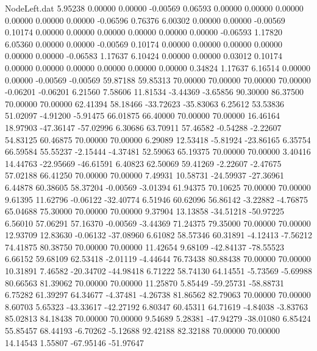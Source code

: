 \begin{filecontents}{NodeLeft.dat}
   5.95238    0.00000    0.00000    -0.00569    0.06593    0.00000    0.00000    0.00000    0.00000    0.00000    0.00000   -0.06596    0.76376
   6.00302    0.00000    0.00000    -0.00569    0.10174    0.00000    0.00000    0.00000    0.00000    0.00000    0.00000   -0.06593    1.17820
   6.05360    0.00000    0.00000    -0.00569    0.10174    0.00000    0.00000    0.00000    0.00000    0.00000    0.00000   -0.06583    1.17637
   6.10424    0.00000    0.00000     0.03012    0.10174    0.00000    0.00000    0.00000    0.00000    0.00000    0.00000    0.34824    1.17637
   6.16514    0.00000    0.00000    -0.00569   -0.00569   59.87188   59.85313   70.00000   70.00000   70.00000   70.00000   -0.06201   -0.06201
   6.21560    7.58606   11.81534    -3.44369   -3.65856   90.30000   86.37500   70.00000   70.00000   62.41394   58.18466  -33.72623  -35.83063
   6.25612   53.53836   51.02097    -4.91200   -5.91475   66.01875   66.40000   70.00000   70.00000   16.46164   18.97903  -47.36147  -57.02996
   6.30686   63.70911   57.46582    -0.54288   -2.22607   54.83125   60.46875   70.00000   70.00000    6.29089   12.53418   -5.81924  -23.86165
   6.35754   66.59584   55.55237    -2.15444   -4.37481   52.59063   65.19375   70.00000   70.00000    3.40416   14.44763  -22.95669  -46.61591
   6.40823   62.50069   59.41269    -2.22607   -2.47675   57.02188   66.41250   70.00000   70.00000    7.49931   10.58731  -24.59937  -27.36961
   6.44878   60.38605   58.37204    -0.00569   -3.01394   61.94375   70.10625   70.00000   70.00000    9.61395   11.62796   -0.06122  -32.40774
   6.51946   60.62096   56.86142    -3.22882   -4.76875   65.04688   75.30000   70.00000   70.00000    9.37904   13.13858  -34.51218  -50.97225
   6.56010   57.06291   57.16370    -0.00569   -3.44369   71.24375   79.35000   70.00000   70.00000   12.93709   12.83630   -0.06132  -37.08960
   6.61082   58.57346   60.31891    -4.12413   -7.56212   74.41875   80.38750   70.00000   70.00000   11.42654    9.68109  -42.84137  -78.55523
   6.66152   59.68109   62.53418    -2.01119   -4.44644   76.73438   80.88438   70.00000   70.00000   10.31891    7.46582  -20.34702  -44.98418
   6.71222   58.74130   64.14551    -5.73569   -5.69988   80.66563   81.39062   70.00000   70.00000   11.25870    5.85449  -59.25731  -58.88731
   6.75282   61.39297   64.34677    -4.37481   -4.26738   81.86562   82.79063   70.00000   70.00000    8.60703    5.65323  -43.33617  -42.27192
   6.80347   60.45311   64.71619    -4.84038   -3.83763   85.02813   84.18438   70.00000   70.00000    9.54689    5.28381  -47.94279  -38.01080
   6.85424   55.85457   68.44193    -6.70262   -5.12688   92.42188   82.32188   70.00000   70.00000   14.14543    1.55807  -67.95146  -51.97647

\end{filecontents}
